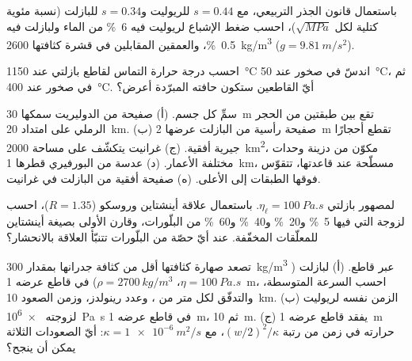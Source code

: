 \begin{exercise}[$\star$]\label{exo:b2:magma-emplacement:2}
باستعمال قانون الجذر التربيعي، مع $s = 0.44$ للريوليت و$s = 0.34$ للبازلت
(نسبة مئوية كتلية لكل $\sqrt{\unit{MPa}}$)، احسب ضغط الإشباع لريوليت
فيه \qty{6}{\percent} من الماء ولبازلت فيه \qty{0.5}{\percent}،
والعمقين المقابلين في قشرة كثافتها \qty{2600}{kg/m^3}
($g = \qty{9.81}{m/s^2}$).
\end{exercise}

\begin{exercise}[$\star$]\label{exo:b2:magma-emplacement:3}
احسب درجة حرارة التماس لقاطع بازلتي عند \qty{1150}{\celsius}
اندسّ في صخور عند \qty{50}{\celsius}، ثم في صخور عند
\qty{400}{\celsius}. أيّ القاطعين ستكون حافته المبرّدة أعرض؟
\end{exercise}

\begin{exercise}[$\star$]\label{exo:b2:magma-emplacement:4}
سمِّ كل جسم. (أ) صفيحة من الدوليريت سمكها \qty{30}{m} تقع بين طبقتين
من الحجر الرملي على امتداد \qty{20}{km}. (ب) صفيحة رأسية من البازلت عرضها \qty{2}{m}
تقطع أحجارًا جيرية أفقية. (ج) غرانيت يتكشّف على مساحة \qty{2000}{km^2}،
مكوّن من دزينة وحدات مختلفة الأعمار. (د) عدسة من البورفيري قطرها \qty{1}{km}،
مسطّحة عند قاعدتها، تتقوّس فوقها الطبقات إلى الأعلى. (ه) صفيحة أفقية
من البازلت في غرانيت.
\end{exercise}

\begin{exercise}[$\star\star$]\label{exo:b2:magma-emplacement:5}
لمصهور بازلتي $\eta_{\ell} = \qty{100}{Pa.s}$. باستعمال علاقة أينشتاين وروسكو
($R = 1.35$)، احسب لزوجة  التي فيها
\qty{5}{\percent} و\qty{20}{\percent} و\qty{40}{\percent} و\qty{60}{\percent} من
البلّورات، وقارن الأولى بصيغة أينشتاين للمعلّقات المخفّفة. عند أيّ حصّة من
البلّورات تتنبّأ العلاقة بالانحشار؟
\end{exercise}

\begin{exercise}[$\star\star$]\label{exo:b2:magma-emplacement:6}
تصعد صهارة كثافتها أقل من كثافة جدرانها بمقدار \qty{300}{kg/m^3} عبر قاطع.
(أ) لبازلت ($\eta = \qty{100}{Pa.s}$، $\rho = \qty{2700}{kg/m^3}$) في قاطع
عرضه \qty{1}{m}، احسب السرعة المتوسطة، والتدفّق لكل متر من ،
وعدد رينولدز، وزمن الصعود \qty{10}{km}. (ب) الزمن نفسه لريوليت لزوجته
\qty{e6}{Pa.s} في قاطع عرضه \qty{1}{m}، ثم \qty{10}{m}. (ج) يفقد قاطع
عرضه \qty{1}{m} حرارته في زمن من رتبة $(w/2)^2/\kappa$، مع $\kappa =
\qty{1e-6}{m^2/s}$: أيّ الصعودات الثلاثة يمكن أن ينجح؟
\end{exercise}

